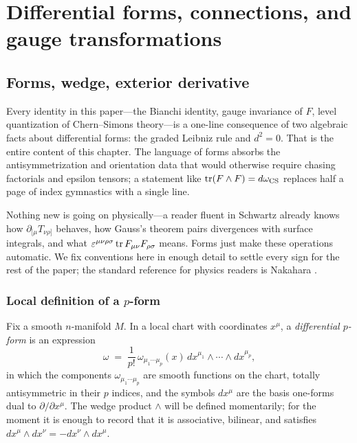 \chapter{Differential forms, connections, and gauge transformations}\label{ch:forms}

\section{Forms, wedge, exterior derivative}\label{sec:forms-basics}

Every identity in this paper---the Bianchi identity, gauge invariance of $F$, level quantization of Chern--Simons theory---is a one-line consequence of two algebraic facts about differential forms: the graded Leibniz rule and $d^2 = 0$. That is the entire content of this chapter. The language of forms absorbs the antisymmetrization and orientation data that would otherwise require chasing factorials and epsilon tensors; a statement like $\operatorname{tr}(F\wedge F) = d\omega_{\operatorname{CS}}$ replaces half a page of index gymnastics with a single line.

\medskip

\noindent Nothing new is going on physically---a reader fluent in Schwartz \cite{Schwartz2014QFT} already knows how $\partial_{[\mu}T_{\nu\rho]}$ behaves, how Gauss's theorem pairs divergences with surface integrals, and what $\varepsilon^{\mu\nu\rho\sigma}\operatorname{tr} F_{\mu\nu}F_{\rho\sigma}$ means. Forms just make these operations automatic. We fix conventions here in enough detail to settle every sign for the rest of the paper; the standard reference for physics readers is Nakahara \cite{Nakahara2003GTP}.

\subsection{Local definition of a $p$-form}

Fix a smooth $n$-manifold $M$. In a local chart with coordinates $x^\mu$, a \emph{differential $p$-form} is an expression
\begin{equation}\label{eq:form-local}
\omega \;=\; \frac{1}{p!}\,\omega_{\mu_1\cdots\mu_p}(x)\,dx^{\mu_1}\wedge\cdots\wedge dx^{\mu_p},
\end{equation}
in which the components $\omega_{\mu_1\cdots\mu_p}$ are smooth functions on the chart, totally antisymmetric in their $p$ indices, and the symbols $dx^\mu$ are the basis one-forms dual to $\partial/\partial x^\mu$. The wedge product $\wedge$ will be defined momentarily; for the moment it is enough to record that it is associative, bilinear, and satisfies $dx^\mu\wedge dx^\nu = -dx^\nu \wedge dx^\mu$.

